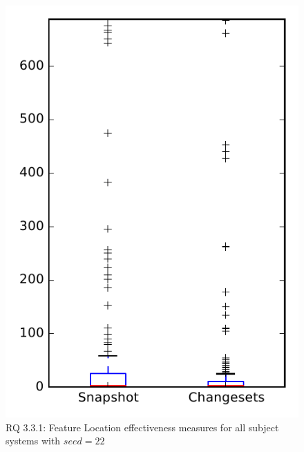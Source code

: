 
\begin{figure}
\centering
\includegraphics[height=0.4\textheight]{figures/flt_seed/rq1_overview_22}
\caption{RQ 3.3.1: Feature Location effectiveness measures for all subject systems with $seed=22$}
\label{fig:flt_seed:rq1:overview}
\end{figure}
